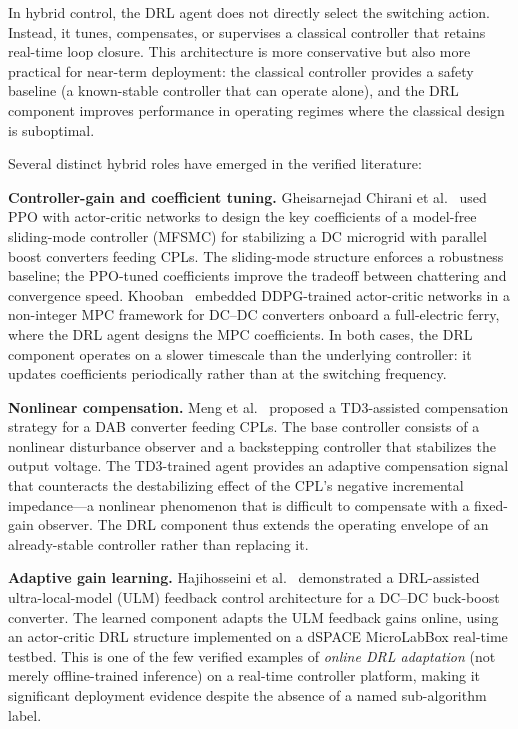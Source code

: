 \documentclass[manuscript,screen,review]{acmart}
\begin{document}
In hybrid control, the DRL agent does not directly select the switching action.
Instead, it tunes, compensates, or supervises a classical controller that retains real-time loop closure.
This architecture is more conservative but also more practical for near-term deployment: the classical controller provides a safety baseline (a known-stable controller that can operate alone), and the DRL component improves performance in operating regimes where the classical design is suboptimal.

Several distinct hybrid roles have emerged in the verified literature:

\textbf{Controller-gain and coefficient tuning.}
Gheisarnejad Chirani et al.~\cite{gheisarnejad2022reducing} used PPO with actor-critic networks to design the key coefficients of a model-free sliding-mode controller (MFSMC) for stabilizing a DC microgrid with parallel boost converters feeding CPLs.
The sliding-mode structure enforces a robustness baseline; the PPO-tuned coefficients improve the tradeoff between chattering and convergence speed.
Khooban~\cite{khooban2022smartenance} embedded DDPG-trained actor-critic networks in a non-integer MPC framework for DC--DC converters onboard a full-electric ferry, where the DRL agent designs the MPC coefficients.
In both cases, the DRL component operates on a slower timescale than the underlying controller: it updates coefficients periodically rather than at the switching frequency.

\textbf{Nonlinear compensation.}
Meng et al.~\cite{meng2022novel} proposed a TD3-assisted compensation strategy for a DAB converter feeding CPLs.
The base controller consists of a nonlinear disturbance observer and a backstepping controller that stabilizes the output voltage.
The TD3-trained agent provides an adaptive compensation signal that counteracts the destabilizing effect of the CPL's negative incremental impedance---a nonlinear phenomenon that is difficult to compensate with a fixed-gain observer.
The DRL component thus extends the operating envelope of an already-stable controller rather than replacing it.

\textbf{Adaptive gain learning.}
Hajihosseini et al.~\cite{hajihosseini2020dc} demonstrated a DRL-assisted ultra-local-model (ULM) feedback control architecture for a DC--DC buck-boost converter.
The learned component adapts the ULM feedback gains online, using an actor-critic DRL structure implemented on a dSPACE MicroLabBox real-time testbed.
This is one of the few verified examples of \emph{online DRL adaptation} (not merely offline-trained inference) on a real-time controller platform, making it significant deployment evidence despite the absence of a named sub-algorithm label.
\end{document}
